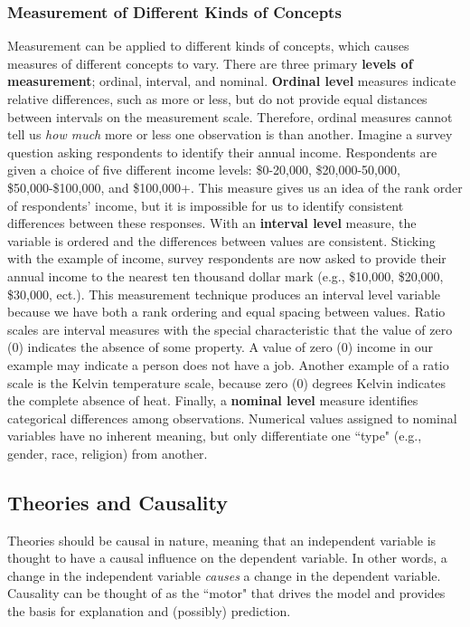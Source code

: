 \documentclass[11pt,openany]{book}\usepackage[]{graphicx}\usepackage[]{color}
\begin{document}
\subsubsection{Measurement of Different Kinds of Concepts}
Measurement can be applied to different kinds of concepts, which causes measures of different concepts to vary. There are three primary \textbf{levels of measurement}; ordinal, interval, and nominal. \textbf{Ordinal level} measures indicate relative differences, such as more or less, but do not provide equal distances between intervals on the measurement scale. Therefore, ordinal measures cannot tell us \textit{how much} more or less one observation is than another. Imagine a survey question asking respondents to identify their annual income. Respondents are given a choice of five different income levels:  \$0-20,000, \$20,000-50,000, \$50,000-\$100,000, and \$100,000+. This measure gives us an idea of the rank order of respondents' income, but it is impossible for us to identify consistent differences between these responses. With an \textbf{interval level} measure, the variable is ordered and the differences between values are consistent. Sticking with the example of income, survey respondents are now asked to provide their annual income to the nearest ten thousand dollar mark (e.g., \$10,000, \$20,000, \$30,000, ect.). This measurement technique produces an interval level variable because we have both a rank ordering and equal spacing between values. Ratio scales are interval measures with the special characteristic that the value of zero (0) indicates the absence of some property. A value of zero (0) income in our example may indicate a person does not have a job. Another example of a ratio scale is the Kelvin temperature scale, because zero (0) degrees Kelvin indicates the complete absence of heat. Finally, a \textbf{nominal level} measure identifies categorical differences among observations. Numerical values assigned to nominal variables have no inherent meaning, but only differentiate one ``type" (e.g., gender, race, religion) from another.

\subsection{Theories and Causality}

Theories should be causal in nature, meaning that an independent variable is thought to have a causal influence on the dependent variable. In other words, a change in the independent variable \textit{causes} a change in the dependent variable. Causality can be thought of as the ``motor" that drives the model and provides the basis for explanation and (possibly) prediction.
\end{document}
